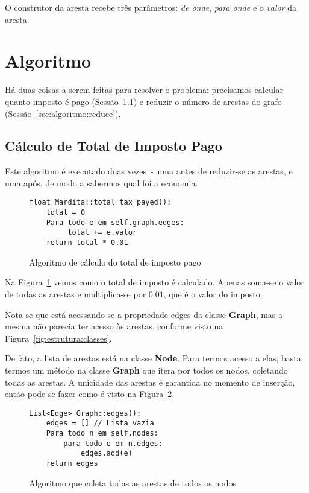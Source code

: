 \documentclass[12pt]{article}
\begin{document}
O construtor da aresta recebe três parâmetros: \textit{de onde}, \textit{para
  onde} e o \textit{valor} da aresta.

\section{Algoritmo}\label{sec:algoritmo}

Há duas coisas a serem feitas para resolver o problema: precisamos calcular
quanto imposto é pago (Sessão~\ref{sec:algoritmo:total_tax}) e reduzir o número
de arestas do grafo (Sessão~\ref{sec:algoritmo:reduce}).

\subsection{Cálculo de Total de Imposto Pago}\label{sec:algoritmo:total_tax}

Este algoritmo é executado duas vezes~-~uma antes de reduzir-se as arestas, e
uma após, de modo a sabermos qual foi a economia.

\begin{figure}[htb!]
  \centering
\begin{lstlisting}
float Mardita::total_tax_payed():
    total = 0
    Para todo e em self.graph.edges:
         total += e.valor
    return total * 0.01
\end{lstlisting}
  \caption{Algoritmo de cálculo do total de imposto pago}
\label{fig:algoritmo:total_tax}
\end{figure}

Na Figura~\ref{fig:algoritmo:total_tax} vemos como o total de imposto é
calculado. Apenas soma-se o valor de todas as arestas e multiplica-se por
$0.01$, que é o valor do imposto.

Nota-se que está acessando-se a propriedade \textsf{edges} da classe
\textsf{\textbf{Graph}}, mas a mesma não parecia ter acesso às arestas, conforme
visto na Figura~\ref{fig:estrutura:classes}.

De fato, a lista de arestas está na classe \textsf{\textbf{Node}}. Para termos
acesso a elas, basta termos um método na classe \textsf{\textbf{Graph}} que
itera por todos os nodos, coletando todas as arestas. A unicidade das arestas é
garantida no momento de inserção, então pode-se fazer como é visto na Figura~\ref{fig:algoritmo:all_edges}.

\begin{figure}[htb!]
  \centering
\begin{lstlisting}
List<Edge> Graph::edges():
    edges = [] // Lista vazia
    Para todo n em self.nodes:
        para todo e em n.edges:
            edges.add(e)
    return edges
\end{lstlisting}
  \caption{Algoritmo que coleta todas as arestas de todos os nodos}
\label{fig:algoritmo:all_edges}
\end{figure}
\end{document}
